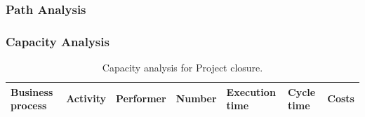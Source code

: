 \subsubsection{Path Analysis}

\begin{alltt}

\end{alltt}


\subsubsection{Capacity Analysis}


\begin{landscape}
\begin{table}
\centering
{\tiny
\begin{tabular}{|l|l|l|l|l|l|l|}
Business process&Activity&Performer&Number&Execution time&Cycle time&Costs\\
\hline

\end{tabular}
}
\caption{Capacity analysis for Project closure.}
\end{table}
\end{landscape}
%

%